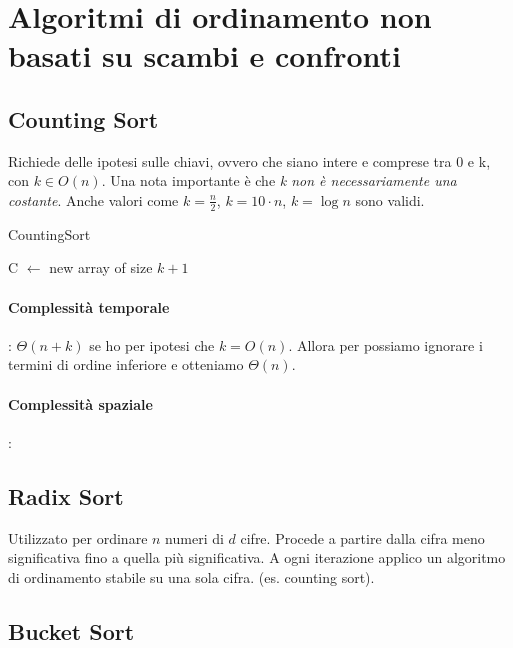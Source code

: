 \documentclass{article}
\begin{document}
\section{Algoritmi di ordinamento non basati su scambi e confronti}
\hypertarget{countingsort}{\subsection{Counting Sort}} %
Richiede delle ipotesi sulle chiavi, ovvero che siano intere e comprese tra 0 e k, con \textbf{$k \in O(n)$}. Una nota importante è 
che \textit{k non è necessariamente una costante}. Anche valori come $k = \frac{n}{2}$, $k = 10 \cdot n$, $k = \log n$ sono validi.


\begin{algorithm}[H]
\caption{CountingSort}
C $\leftarrow$ new array of size $k+1$\; 
\end{algorithm}
\paragraph{Complessità temporale}: $\Theta(n+k)$ se ho per ipotesi che $k = O(n)$. Allora per possiamo ignorare i termini di ordine inferiore e otteniamo $\Theta(n)$.
\paragraph{Complessità spaziale}: 


\hypertarget{radix}{\subsection{Radix Sort}} %
Utilizzato per ordinare $n$ numeri di $d$ cifre. Procede a partire dalla cifra meno significativa fino a quella più significativa. A ogni iterazione applico un 
algoritmo di ordinamento stabile su una sola cifra. (es. counting sort).

\hypertarget{bucketsort}{\subsection{Bucket Sort}} %
\newpage
\end{document}
